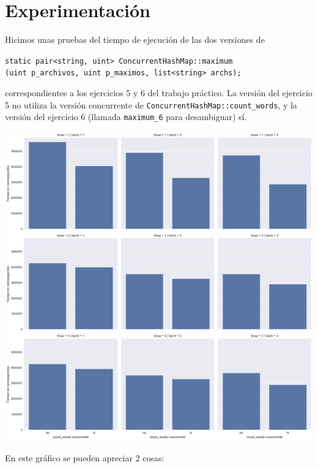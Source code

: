 \section{Experimentación}

Hicimos unas pruebas del tiempo de ejecución de las dos versiones de

\begin{center}
	\texttt{static pair<string, uint> ConcurrentHashMap::maximum\\(uint p\_archivos, uint p\_maximos, list<string> archs);}
\end{center}

correspondientes a los ejercicios 5 y 6 del trabajo práctico. La versión del ejercicio 5 no utiliza la versión concurrente de \texttt{ConcurrentHashMap::count\_words}, y la versión del ejercicio 6 (llamada \texttt{maximum\_6} para desambiguar) sí.

\begin{center}
	\includegraphics[scale=0.45]{imgs/5-vs-6.png}
\end{center}

En este gráfico se pueden apreciar 2 cosas:

